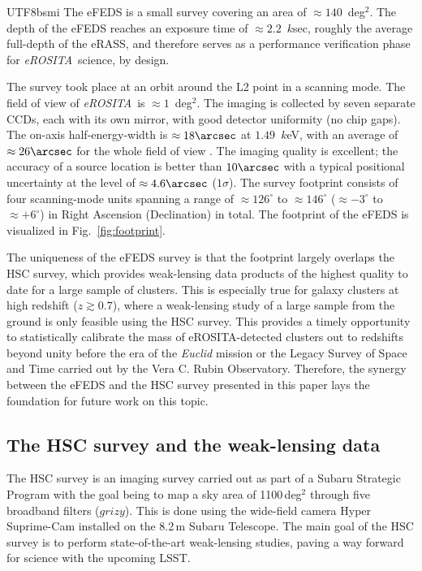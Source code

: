 \documentclass[longauth]{aa}
\newcommand{\redshift}{\ensuremath{z}}
\newcommand{\eROSITA}{\emph{eROSITA}}
\begin{document}
\begin{CJK*}{UTF8}{bsmi}
The eFEDS is a small survey covering an area of $\approx140$~deg$^2$.
The depth of the eFEDS reaches an exposure time of $\approx2.2$~$k$sec, roughly the average full-depth of the eRASS, and therefore serves as a performance verification phase for \eROSITA\ science, by design.


The survey took place at an orbit around the L2 point in a scanning mode.
The field of view of \eROSITA\ is $\approx1$~deg$^2$.
The imaging is collected by seven  separate CCDs,  each with its own mirror, with good detector uniformity (no chip gaps).
The on-axis half-energy-width is $\approx18\arcsec$ at $1.49$~$k$eV, with an average of $\approx26\arcsec$ for the whole field of view \citep{predehl21}.
The imaging quality is excellent; the accuracy of a source location is better than $10\arcsec$ with a typical positional uncertainty at the level of $\approx4.6\arcsec$ ($1\sigma$).
The survey footprint consists of four scanning-mode units spanning a range of $\approx126^{\circ}$ to $\approx146^{\circ}$ ($\approx-3^{\circ}$ to $\approx+6^{\circ}$) in Right Ascension (Declination) in total.
The footprint of the eFEDS is visualized in Fig.~\ref{fig:footprint}.


The uniqueness of the eFEDS survey is that the footprint largely overlaps the HSC survey, which provides weak-lensing data products of the highest quality to date for a large sample of clusters.
This is especially true for galaxy clusters at high redshift ($\redshift\gtrsim0.7$), where a weak-lensing study of a large sample from the ground is only feasible using the HSC survey.
This provides a timely opportunity to statistically calibrate the mass of eROSITA-detected clusters out to redshifts beyond unity before the era of the \textit{Euclid} mission \citep{laureijs10} or the Legacy Survey of Space and Time \citep[LSST;][]{ivezic08} carried out by the Vera C. Rubin Observatory.
Therefore, the synergy between the eFEDS and the HSC survey presented in this paper lays the foundation for future work on this topic.

\subsection{The HSC survey and the weak-lensing data}
\label{sec:hsc}

The HSC survey \citep{aihara18a} is an imaging survey carried out as part of a Subaru Strategic Program with the goal being to map a sky area of 1100\,deg$^2$ through five broadband filters ($grizy$).
This is done using the wide-field camera Hyper Suprime-Cam \citep{miyazaki15,miyazaki18} installed on the 8.2\,m Subaru Telescope. 
The main goal of the HSC survey is to perform state-of-the-art weak-lensing studies, paving a way forward for science with the upcoming LSST.


\end{CJK*}
\end{document}
